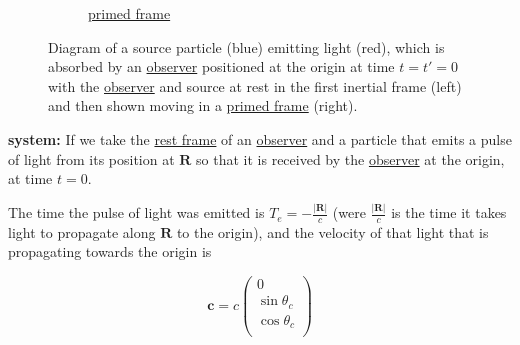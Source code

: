 \begin{figure}[ht]
\begin{subfigure}[b]{.49\textwidth}
		\caption{\hyperlink{def-Primed-Frame}{primed frame}}
	\end{subfigure}
	\caption{Diagram of a source particle (blue) emitting light (red), which is absorbed by an \protect\hyperlink{def-observer}{observer} positioned at the origin at time $t=t'=0$ with the \protect\hyperlink{def-observer}{observer} and source at rest in the first inertial frame (left) and then shown moving in a \protect\hyperlink{def-Primed-Frame}{primed frame} (right).}
	\label{fig: Retarded field}
\end{figure}

\noindent
\textbf{system:} \newline
If we take the \hyperlink{def-proper-frame}{rest frame} of an \hyperlink{def-observer}{observer} and a particle that emits a pulse of light from its position at $\mathbf{R}$ so that it is received by the \hyperlink{def-observer}{observer} at the origin, at time $t=0$.

The time the pulse of light was emitted is $T_{e}= -\frac{|\mathbf{R}|}{c}$ (were $\frac{|\mathbf{R}|}{c}$ is the time it takes light to propagate along $\mathbf{R}$ to the origin), and the velocity of that light that is propagating towards the origin is

\begin{equation}
	\mathbf{c} = c
	\begin{pmatrix}
		0              \\
		\sin{\theta_c} \\
		\cos{\theta_c} \\
	\end{pmatrix}
\end{equation}

